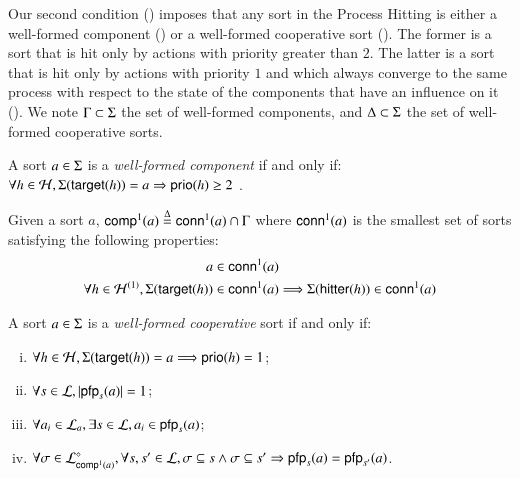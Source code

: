 Our second condition () imposes that any sort in the Process
Hitting is either a well-formed component () or a well-formed cooperative sort
().
The former is a sort that is hit only by actions with priority greater than $2$.
The latter is a sort that is hit only by actions with priority $1$ and which
always converge to the same process with respect to the state of the components
that have an influence on it ().
We note $\components\subset\Sigma$ the set of well-formed components,
and $\cs\subset\Sigma$ the set of well-formed cooperative sorts.

\begin{definition}
\label{def:component}
A sort $a \in \PHs$ is a \emph{well-formed component} if and only if:
    $\forall h \in \PHh, \PHsort(\PHtarget(h)) = a \Rightarrow \prio(h) \geq 2$ \enspace.
\end{definition}

\begin{definition}
\label{def:conn}
Given a sort $a$, $\compin(a)\DEF \conn(a)\cap\components$ where
$\conn(a)$ is the smallest set of sorts satisfying the following properties:
\begin{align*}
a\in\conn(a) &
\\
\forall h\in  \PHh^{(1)},
	\Sigma(\target{h})\in\conn(a) & \Longrightarrow \Sigma(\hitter{h})\in\conn(a)
\end{align*}
\end{definition}

\begin{definition}
\label{def:cs}
A sort $a \in \PHs$ is a \emph{well-formed cooperative} sort if and only if:
\begin{enumerate}[(i)]
\item $\forall h\in\PHh, \Sigma(\PHtarget(h))=a \Longrightarrow \prio(h) = 1$;
\item\label{csai} $\forall s\in\PHl, \card{\pfp_s(a)} = 1$;
\item\label{css} $\forall a_i \in \PHl_a, \exists s \in \PHl, a_i\in\pfp_s(a)$;
\item $\forall \sigma\in\PHsubl[\PHl]_{\compin(a)},
			\forall s,s'\in\PHl,
				\sigma\subseteq s\wedge \sigma\subseteq s'\Rightarrow 
							\pfp_s(a) = \pfp_{s'}(a)$\enspace.
\end{enumerate}
\end{definition}

